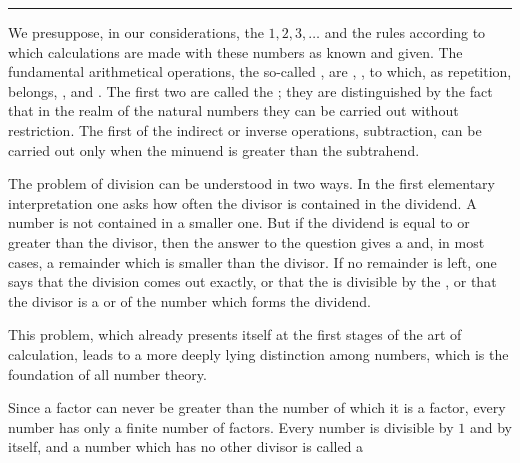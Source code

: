 \begin{center}
{\large{}}

\rule{0.18\linewidth}{0.4pt}
\end{center}

We presuppose, in our considerations, the 
$1,2,3,\ldots$ and the rules according to which calculations are made
with these numbers as known and given. The fundamental arithmetical
operations, the so-called , are ,
, to which, as repetition, 
belongs, , and . The first two are
called the ; they are
distinguished by the fact that in the realm of the natural numbers they
can be carried out without restriction. The first of the indirect or
inverse operations, subtraction, can be carried out only when the
minuend is greater than the subtrahend.

The problem of division can be understood in two ways. In the first
elementary interpretation one asks how often the divisor is contained
in the dividend. A number is not contained in a smaller one. But if the
dividend is equal to or greater than the divisor, then the answer to the
question gives a  and, in most cases, a remainder
which is smaller than the divisor. If no remainder is left, one says
that the division comes out exactly, or that the  is
divisible by the , or that the divisor is a
 or  of the number which forms the
dividend.

This problem, which already presents itself at the first stages of the
art of calculation, leads to a more deeply lying distinction among
numbers, which is the foundation of all number theory.

Since a factor can never be greater than the number of which it is a
factor, every number has only a finite number of factors. Every number
is divisible by $1$ and by itself, and a number which has no other
divisor is called a 
